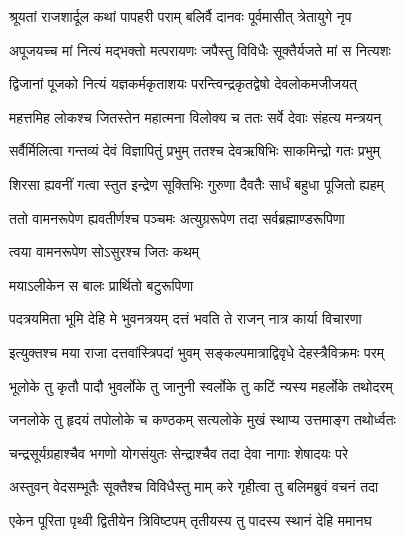 
\twolineshloka
{श्रूयतां राजशार्दूल कथां पापहरी पराम्}
{बलिर्वै दानवः पूर्वमासीत् त्रेतायुगे नृप} %

\twolineshloka
{अपूजयच्च मां नित्यं मद्भक्तो मत्परायणः}
{जपैस्तु विविधैः सूक्तैर्यजते मां स नित्यशः} %

\twolineshloka
{द्विजानां पूजको नित्यं यज्ञकर्मकृताशयः}
{परन्त्विन्द्रकृतद्वेषो देवलोकमजीजयत्} %

\twolineshloka
{महत्तमिह लोकश्च जितस्तेन महात्मना}
{विलोक्य च ततः सर्वे देवाः संहत्य मन्त्रयन्} %

\twolineshloka
{सर्वैर्मिलित्वा गन्तव्यं देवं विज्ञापितुं प्रभुम्}
{ततश्च देवऋषिभिः साकमिन्द्रो गतः प्रभुम्} %

\twolineshloka
{शिरसा ह्यवनीं गत्वा स्तुत इन्द्रेण सूक्तिभिः}
{गुरुणा दैवतैः सार्धं बहुधा पूजितो ह्यहम्} %

\twolineshloka
{ततो वामनरूपेण ह्यवतीर्णश्च पञ्चमः}
{अत्युग्ररूपेण तदा सर्वब्रह्माण्डरूपिणा} %



\onelineshloka
{त्वया वामनरूपेण सोऽसुरश्च जितः कथम्} %



\onelineshloka
{मयाऽलीकेन स बालः प्रार्थितो बटुरूपिणा} %

\twolineshloka
{पदत्रयमिता भूमि देहि मे भुवनत्रयम्}
{दत्तं भवति ते राजन् नात्र कार्या विचारणा} %

\twolineshloka
{इत्युक्तश्च मया राजा दत्तवांस्त्रिपदां भुवम्}
{सङ्कल्पमात्राद्विवृधे देहस्त्रैविक्रमः परम्} %

\twolineshloka
{भूलोके तु कृतौ पादौ भुवर्लोके तु जानुनी}
{स्वर्लोके तु कटिं न्यस्य महर्लोके तथोदरम्} %

\twolineshloka
{जनलोके तु हृदयं तपोलोके च कण्ठकम्}
{सत्यलोके मुखं स्थाप्य उत्तमाङ्ग तथोर्ध्वतः} %

\twolineshloka
{चन्द्रसूर्यग्रहाश्चैव भगणो योगसंयुतः}
{सेन्द्राश्चैव तदा देवा नागाः शेषादयः परे} %

\twolineshloka
{अस्तुवन् वेदसम्भूतैः सूक्तैश्च विविधैस्तु माम्}
{करे गृहीत्वा तु बलिमब्रुवं वचनं तदा} %

\twolineshloka
{एकेन पूरिता पृथ्वी द्वितीयेन त्रिविष्टपम्}
{तृतीयस्य तु पादस्य स्थानं देहि ममानघ} %

